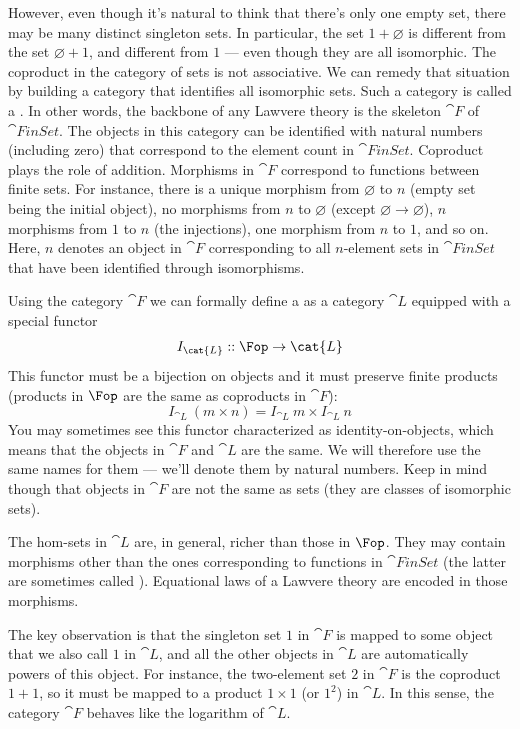 However, even though it's natural to think that there's only one empty
set, there may be many distinct singleton sets. In particular, the set
$1 + \varnothing$ is different from the set $\varnothing + 1$, and
different from $1$ --- even though they are all isomorphic. The
coproduct in the category of sets is not associative. We can remedy that
situation by building a category that identifies all isomorphic sets.
Such a category is called a . In other words, the
backbone of any Lawvere theory is the skeleton $\cat{F}$ of
$\cat{FinSet}$. The objects in this category can be identified with
natural numbers (including zero) that correspond to the element count in
$\cat{FinSet}$. Coproduct plays the role of addition. Morphisms in
$\cat{F}$ correspond to functions between finite sets. For instance,
there is a unique morphism from $\varnothing$ to $n$ (empty set
being the initial object), no morphisms from $n$ to $\varnothing$
(except $\varnothing \to \varnothing$), $n$ morphisms from $1$ to
$n$ (the injections), one morphism from $n$ to $1$,
and so on. Here, $n$ denotes an object in $\cat{F}$
corresponding to all $n$-element sets in $\cat{FinSet}$ that have been
identified through isomorphisms.

Using the category $\cat{F}$ we can formally define a  as a category $\cat{L}$ equipped with a special functor
\[I_{\cat{L}} :: \Fop \to \cat{L}\]
This functor must be a bijection on objects and it must preserve finite
products (products in $\Fop$ are the same as
coproducts in $\cat{F}$):
\[I_{\cat{L}}\ (m\times{}n) = I_{\cat{L}}\ m\times{}I_{\cat{L}}\ n\]
You may sometimes see this functor characterized as identity-on-objects,
which means that the objects in $\cat{F}$ and $\cat{L}$ are the same.
We will therefore use the same names for them --- we'll denote them by
natural numbers. Keep in mind though that objects in $\cat{F}$ are not
the same as sets (they are classes of isomorphic sets).

The hom-sets in $\cat{L}$ are, in general, richer than those in
$\Fop$. They may contain morphisms other than
the ones corresponding to functions in $\cat{FinSet}$ (the latter are
sometimes called ). Equational laws of a
Lawvere theory are encoded in those morphisms.

The key observation is that the singleton set $1$ in $\cat{F}$
is mapped to some object that we also call $1$ in $\cat{L}$, and
all the other objects in $\cat{L}$ are automatically powers of this
object. For instance, the two-element set $2$ in $\cat{F}$ is
the coproduct $1 + 1$, so it must be mapped to a product
$1 \times 1$ (or $1^2$) in $\cat{L}$. In this sense, the category
$\cat{F}$ behaves like the logarithm of $\cat{L}$.

